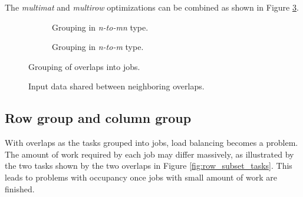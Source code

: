The \textit{multimat} and \textit{multirow} optimizations can be combined as shown in Figure \ref{fig:job_size_modifiers}.



\begin{figure}[ht]
	\centering	
	\begin{subfigure}{0.4\textwidth}
		\centering
		\def\svgwidth{\textwidth}
		\fontsize{8}{10}\selectfont
		
		\caption{Grouping in \textit{n-to-mn} type.}
		\label{fig:job_size_modifiers_n_to_mn}
	\end{subfigure}
	\hfill
	\begin{subfigure}{0.4\textwidth}
		\centering
		\def\svgwidth{\textwidth}
		\fontsize{8}{10}\selectfont
		
		\caption{Grouping in \textit{n-to-m} type.}
		\label{fig:job_size_modifiers_n_to_m}
	\end{subfigure}
	
	\caption{Grouping of overlaps into jobs.}
	\label{fig:job_size_modifiers}
\end{figure}

\begin{figure}[ht]
	\centering
	\def\svgwidth{0.5\textwidth}
	\fontsize{8}{10}\selectfont
	
	\caption{Input data shared between neighboring overlaps.}
	\label{fig:multirow_shared_input}
\end{figure}

\subsection{Row group and column group}
\label{sec:data_reuse_row_column_group}


With overlaps as the tasks grouped into jobs, load balancing becomes a problem. The amount of work required by each job may differ massively, as illustrated by the two tasks shown by the two overlaps in Figure \ref{fig:row_subset_tasks}. This leads to problems with occupancy once jobs with small amount of work are finished. 

